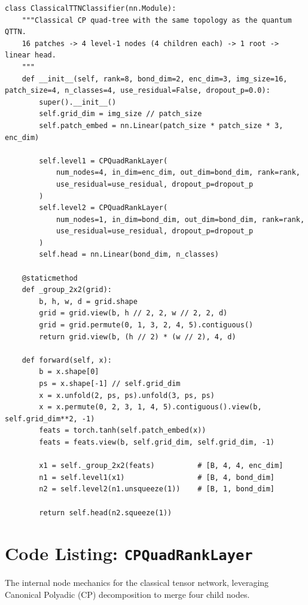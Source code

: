 \documentclass[12pt, a4paper, oneside]{report}
\begin{document}
\begin{verbatim}
class ClassicalTTNClassifier(nn.Module):
    """Classical CP quad-tree with the same topology as the quantum QTTN.
    16 patches -> 4 level-1 nodes (4 children each) -> 1 root -> linear head.
    """
    def __init__(self, rank=8, bond_dim=2, enc_dim=3, img_size=16, patch_size=4, n_classes=4, use_residual=False, dropout_p=0.0):
        super().__init__()
        self.grid_dim = img_size // patch_size
        self.patch_embed = nn.Linear(patch_size * patch_size * 3, enc_dim)

        self.level1 = CPQuadRankLayer(
            num_nodes=4, in_dim=enc_dim, out_dim=bond_dim, rank=rank,
            use_residual=use_residual, dropout_p=dropout_p
        )
        self.level2 = CPQuadRankLayer(
            num_nodes=1, in_dim=bond_dim, out_dim=bond_dim, rank=rank,
            use_residual=use_residual, dropout_p=dropout_p
        )
        self.head = nn.Linear(bond_dim, n_classes)

    @staticmethod
    def _group_2x2(grid):
        b, h, w, d = grid.shape
        grid = grid.view(b, h // 2, 2, w // 2, 2, d)
        grid = grid.permute(0, 1, 3, 2, 4, 5).contiguous()
        return grid.view(b, (h // 2) * (w // 2), 4, d)

    def forward(self, x):
        b = x.shape[0]
        ps = x.shape[-1] // self.grid_dim
        x = x.unfold(2, ps, ps).unfold(3, ps, ps)
        x = x.permute(0, 2, 3, 1, 4, 5).contiguous().view(b, self.grid_dim**2, -1)
        feats = torch.tanh(self.patch_embed(x))
        feats = feats.view(b, self.grid_dim, self.grid_dim, -1)

        x1 = self._group_2x2(feats)          # [B, 4, 4, enc_dim]
        n1 = self.level1(x1)                 # [B, 4, bond_dim]
        n2 = self.level2(n1.unsqueeze(1))    # [B, 1, bond_dim]

        return self.head(n2.squeeze(1))
\end{verbatim}

\section*{Code Listing: \texttt{CPQuadRankLayer}}
The internal node mechanics for the classical tensor network, leveraging Canonical Polyadic (CP) decomposition to merge four child nodes.
\end{document}

